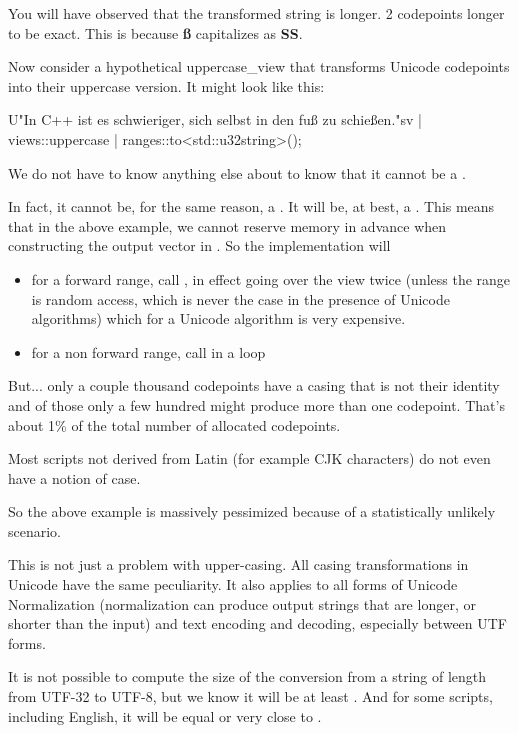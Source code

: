 \documentclass{wg21}
\begin{document}
You will have observed that the transformed string is longer.
2 codepoints longer to be exact. This is because \textbf{ß} capitalizes as \textbf{SS}.

Now consider a hypothetical uppercase_view that transforms Unicode codepoints into their uppercase version.
It might look like this:

\begin{colorblock}
U"In C++ ist es schwieriger, sich selbst in den fuß zu schießen."sv
    | views::uppercase
    | ranges::to<std::u32string>();
\end{colorblock}

We do not have to know anything else about  to know that it cannot be a .

In fact, it cannot be, for the same reason, a .  It will be, at best, a .
This means that in the above example, we cannot reserve memory in advance when constructing the output vector in .
So the implementation will
\begin{itemize}
\item for a forward range, call , in effect going over the view twice (unless the range is random access, which is never the case in the presence of Unicode algorithms) which for a Unicode algorithm is very expensive.
\item for a non forward range, call  in a loop
\end{itemize}

But... only a couple thousand codepoints have a casing that is not their identity and of those only a few hundred might produce more than
one codepoint. That's about 1\% of the total number of allocated codepoints.

Most scripts not derived from Latin (for example CJK characters) do not even have a notion of case.

So the above example is massively pessimized because of a statistically unlikely scenario.

This is not just a problem with upper-casing. All casing transformations in Unicode have the same peculiarity.
It also applies to all forms of Unicode Normalization (normalization can produce output strings that are longer, or shorter than the input)
and text encoding and decoding, especially between UTF forms.

It is not possible to compute the size of the conversion from a string of length  from UTF-32 to UTF-8, but we know it will be at least .
And for some scripts, including English, it will be equal or very close to .
\end{document}
